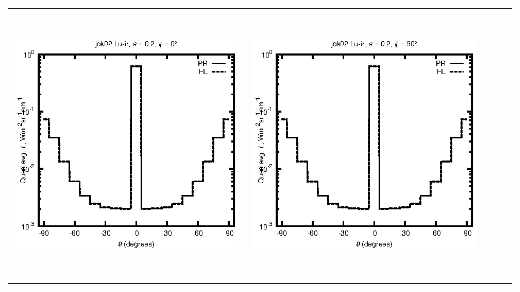 \documentclass[10pt,a4paper]{article}
\begin{document}
\begin{adjustwidth}{-1.2in}{-1.2in}
\begin{tabular}{c c c c}
\includegraphics[height=7cm]{../eps/jok02_Lu_ir_fwd.eps} &
\includegraphics[height=7cm]{../eps/jok02_Lu_ir_cross.eps} \\
\end{tabular}

\pagebreak


\end{adjustwidth}
\end{document}
